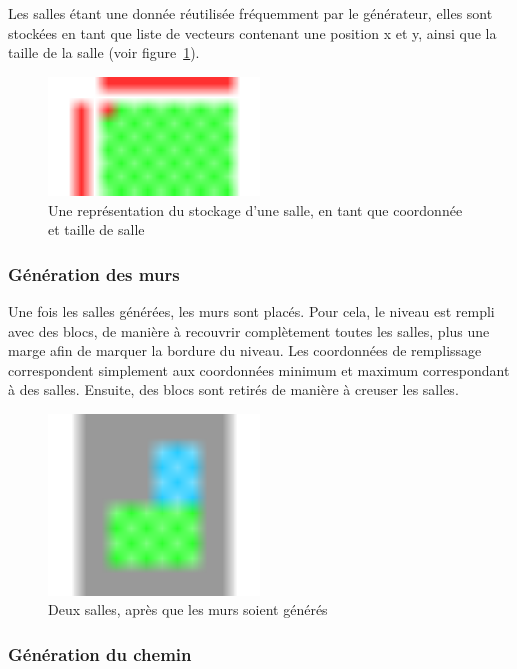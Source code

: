 \documentclass[10pt]{report}
\begin{document}
Les salles étant une donnée réutilisée fréquemment par le générateur,
elles sont stockées en tant que liste de vecteurs contenant une position
x et y, ainsi que la taille de la salle (voir figure~\ref{fig:room_data}).

\begin{figure}[H]
  \centering
  \includegraphics[width=0.5\textwidth]{images/room_storage}
  \caption{Une représentation du stockage d'une salle, 
  en tant que coordonnée et taille de salle}
  \label{fig:room_data}
\end{figure}

\subsubsection{Génération des murs}

Une fois les salles générées, les murs sont placés.
Pour cela, le niveau est rempli avec des blocs, de manière à recouvrir complètement toutes
les salles, plus une marge afin de marquer la bordure du niveau. 
Les coordonnées de remplissage correspondent simplement aux coordonnées
minimum et maximum correspondant à des salles.
Ensuite, des blocs sont retirés de manière à creuser les salles.

\begin{figure}[H]
  \centering
  \includegraphics[width=0.5\textwidth]{images/filling_the_world}
  \caption{Deux salles, après que les murs soient générés}
  \label{fig:filling_world}
\end{figure}

\subsubsection{Génération du chemin}
\end{document}

